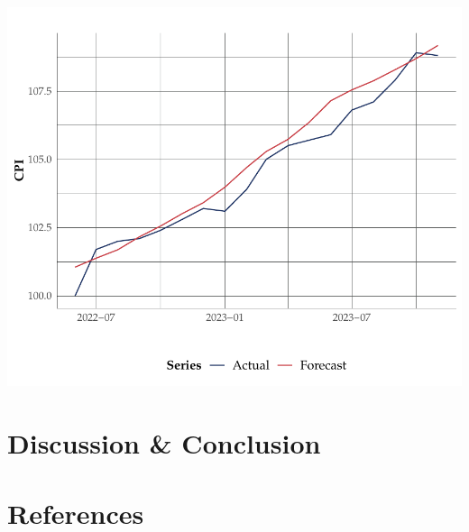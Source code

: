 \documentclass[11pt,preprint, authoryear]{elsarticle}
\let\origfigure\figure
\let\endorigfigure\endfigure
\renewenvironment{figure}[1][2] {
    \expandafter\origfigure\expandafter[H]
} {
    \endorigfigure
}
\numberwithin{equation}{section}
\numberwithin{figure}{section}
\numberwithin{table}{section}
\begin{document}
\begin{figure}
\centering
\includegraphics{FMX-Proj-Write_Up_files/figure-latex/unnamed-chunk-1-1.pdf}
\caption{Forecasted change in CPI (with 95\% Confidence Intervals)
\label{Figure4}}
\end{figure}

\hypertarget{discussion-conclusion}{%
\section{Discussion \& Conclusion}\label{discussion-conclusion}}

\newpage

\hypertarget{references}{%
\section*{References}\label{references}}
\end{document}

